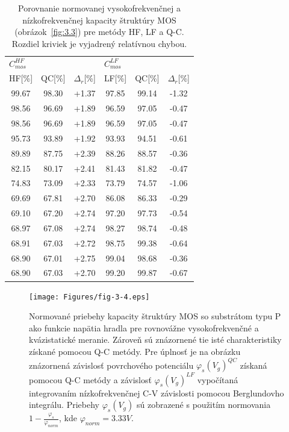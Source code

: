 \begin{table}[h!]\centering
  \begin{tabular}{c c c c c c}
    \multicolumn{3}{l}{$C^{HF}_{mos}$} & \multicolumn{3}{l}{$C^{LF}_{mos}$} \\
    HF[\%] & QC[\%] & $\Delta_r$[\%] & LF[\%] & QC[\%] & $\Delta_r$[\%] \\
    \hline%
    99.67 & 98.30 & +1.37 & 97.85 & 99.14 & -1.32 \\
    98.56 & 96.69 & +1.89 & 96.59 & 97.05 & -0.47 \\
    98.56 & 96.69 & +1.89 & 96.59 & 97.05 & -0.47 \\
    95.73 & 93.89 & +1.92 & 93.93 & 94.51 & -0.61 \\
    89.89 & 87.75 & +2.39 & 88.26 & 88.57 & -0.36 \\
    82.15 & 80.17 & +2.41 & 81.43 & 81.82 & -0.47 \\
    74.83 & 73.09 & +2.33 & 73.79 & 74.57 & -1.06 \\
    69.69 & 67.81 & +2.70 & 86.08 & 86.33 & -0.29 \\
    69.10 & 67.20 & +2.74 & 97.20 & 97.73 & -0.54 \\
    68.97 & 67.08 & +2.74 & 98.27 & 98.74 & -0.48 \\
    68.91 & 67.03 & +2.72 & 98.75 & 99.38 & -0.64 \\
    68.90 & 67.01 & +2.75 & 99.04 & 98.68 & -0.36 \\
    68.90 & 67.03 & +2.70 & 99.20 & 99.87 & -0.67 \\
  \end{tabular}
  \caption[Porovnanie normovanej vysokofrekvenčnej a nízkofrekvenčnej
    kapacity štruktúry MOS (obrázok~\ref{fig:3.3}) pre metódy HF, LF a
    Q-C]{Porovnanie normovanej vysokofrekvenčnej a nízkofrekvenčnej
    kapacity štruktúry MOS (obrázok~\ref{fig:3.3}) pre metódy HF, LF a
    Q-C. Rozdiel kriviek je vyjadrený relatívnou chybou.}\label{tab:3.1}
\end{table}

\newpage
\begin{figure}[h!]\centering
  \texttt{[image: Figures/fig-3-4.eps]}
  \caption[Normované priebehy kapacity štruktúry MOS so substrátom typu
  P ako funkcie napätia hradla pre rovnovážne vysokofrekvenčné a
  kvázistatické meranie]{Normované priebehy kapacity štruktúry MOS so
  substrátom typu P ako funkcie napätia hradla pre rovnovážne
  vysokofrekvenčné a kvázistatické meranie.  Zároveň sú znázornené tie
  isté charakteristiky získané pomocou Q-C metódy. Pre úplnosť je na
  obrázku znázornená závislosť povrchového potenciálu
  ${\varphi_s(V_g)}^{QC}$ získaná pomocou Q-C metódy a závislosť
  ${\varphi_s(V_g)}^{LF}$ vypočítaná integrovaním nízkofrekvenčnej C-V
  závislosti pomocou Berglundovho integrálu.  Priebehy
  $\varphi_s(V_g)$ sú zobrazené s použitím normovania $1 -
  \frac{\varphi_s}{\varphi_{norm}}$, kde $\varphi_{norm}=3.33V$.}\label{fig:3.4}
\end{figure}

